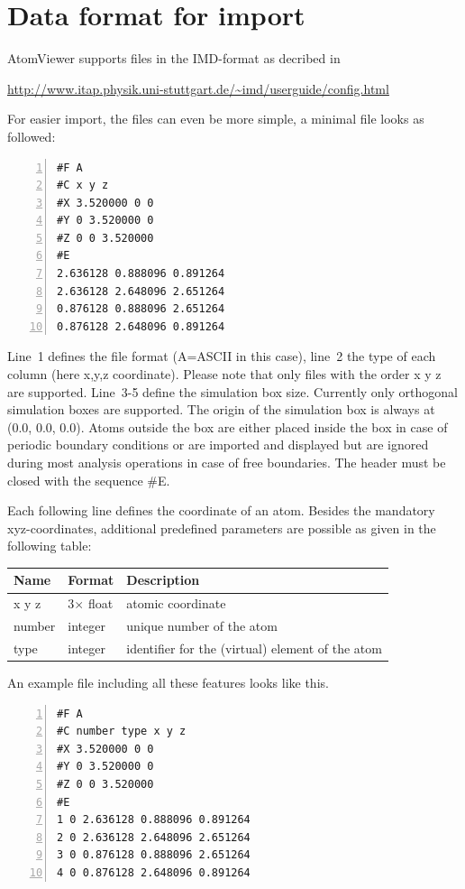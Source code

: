 \documentclass[a4paper,12pt]{scrartcl}
\begin{document}
\section{Data format for import}
AtomViewer supports files in the IMD-format as decribed in

\url{http://www.itap.physik.uni-stuttgart.de/~imd/userguide/config.html}

For easier import, the files can even be more simple, a minimal file looks as followed:

\begin{Verbatim}[frame=single, samepage=true, numbers = left]
#F A
#C x y z
#X 3.520000 0 0
#Y 0 3.520000 0
#Z 0 0 3.520000
#E
2.636128 0.888096 0.891264
2.636128 2.648096 2.651264
0.876128 0.888096 2.651264
0.876128 2.648096 0.891264
\end{Verbatim}

Line~1 defines the file format (A=ASCII in this case), line~2 the type of each column (here x,y,z coordinate). Please note that only files with the order x y z are supported.
Line~3-5 define the simulation box size. Currently only orthogonal simulation boxes are supported. The origin of the simulation box is always at (0.0, 0.0, 0.0). Atoms outside the box are either placed inside the box in case of periodic boundary conditions or are imported and displayed but are ignored during most analysis operations in case of free boundaries.
The header must be closed with the sequence \#E.

Each following line defines the coordinate of an atom.
Besides the mandatory xyz-coordinates, additional predefined parameters are possible as given in the following table:

\begin{center}
\begin{tabular}{l|l|l}
Name & Format & Description\\
\hline
x y z & 3$\times$ float & atomic coordinate\\
number & integer & unique number of the atom\\
type & integer & identifier for the (virtual) element of the atom\\
\end{tabular}
\end{center}

An example file including all these features looks like this.
\begin{Verbatim}[frame=single, samepage=true, numbers = left]
#F A
#C number type x y z
#X 3.520000 0 0
#Y 0 3.520000 0
#Z 0 0 3.520000
#E
1 0 2.636128 0.888096 0.891264
2 0 2.636128 2.648096 2.651264
3 0 0.876128 0.888096 2.651264
4 0 0.876128 2.648096 0.891264
\end{Verbatim}
\end{document}
